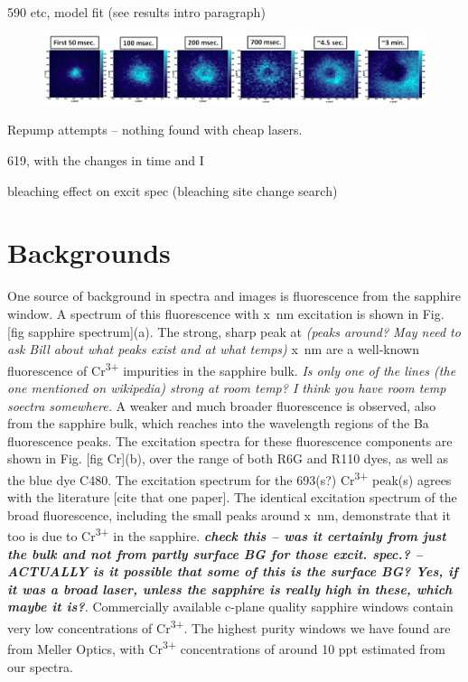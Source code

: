 590 etc, model fit (see results intro paragraph)

\begin{figure} %
        \centering
                \includegraphics[width=.9\textwidth]{figures/hole_bleach_590.png}
                \caption{}
\label{fig:testfig}
\end{figure}

Repump attempts -- nothing found with cheap lasers.

619, with the changes in time and I

bleaching effect on excit spec (bleaching site change search)

\section{Backgrounds}
\label{sec:bgs}

One source of background in spectra and images is fluorescence from the sapphire window.  A spectrum of this fluorescence with x~nm excitation is shown in Fig. [fig sapphire spectrum](a).  The strong, sharp peak at \emph{\color{gray}(peaks around? May need to ask Bill about what peaks exist and at what temps)} x~nm are a well-known fluorescence of Cr\textsuperscript{3+} impurities in the sapphire bulk.  \emph{\color{gray}Is only one of the lines (the one mentioned on wikipedia) strong at room temp?  I think you have room temp soectra somewhere.}  A weaker and much broader fluorescence is observed, also from the sapphire bulk, which reaches into the wavelength regions of the Ba fluorescence peaks.  The excitation spectra for these fluorescence components are shown in Fig. [fig Cr](b), over the range of both R6G and R110 dyes, as well as the blue dye C480.  The excitation spectrum for the {\color{red}693(s?)} Cr\textsuperscript{3+} peak{\color{red}(s)} agrees with the literature [cite that one paper].  The identical excitation spectrum of the broad fluorescence, including the small peaks around x~nm, demonstrate that it too is due to Cr\textsuperscript{3+} in the sapphire.  \emph{\color{gray}\textbf{check this -- was it certainly from just the bulk and not from partly surface BG for those excit. spec.? -- ACTUALLY is it possible that some of this is the surface BG?  Yes, if it was a broad laser, unless the sapphire is really high in these, which maybe it is?}.}  Commercially available c-plane quality sapphire windows contain very low concentrations of Cr\textsuperscript{3+}.  The highest purity windows we have found are from Meller Optics, with Cr\textsuperscript{3+} concentrations of around {\color{red}10 ppt} estimated from our spectra.

